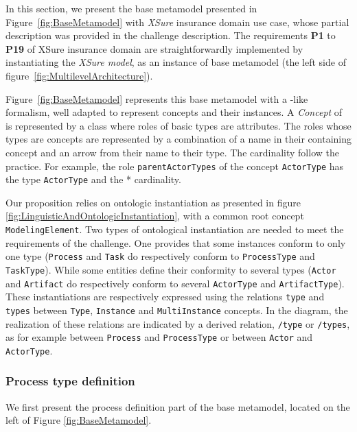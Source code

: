In this section, we present the base metamodel presented in Figure~\ref{fig:BaseMetamodel} with \textit{XSure} insurance domain use case, whose partial description was provided in the challenge description. The requirements \textbf{P1} to \textbf{P19} of XSure insurance domain are straightforwardly implemented by instantiating the \emph{XSure model}, as an instance of base metamodel (the left side of figure~\ref{fig:MultilevelArchitecture}).

Figure~\ref{fig:BaseMetamodel} represents this base metamodel with a \UML-like formalism, well adapted to represent \FML concepts and their instances. A \textit{Concept} of \FML is represented by a \UML class where roles of basic types are attributes. The roles whose types are concepts are represented by a combination of a name in their containing concept and an arrow from their name to their type. The cardinality follow the \UML practice.
For example, the role \texttt{parentActorTypes} of the concept \texttt{ActorType} has the type \texttt{ActorType} and the * cardinality.

Our proposition relies on ontologic instantiation as presented in figure \ref{fig:LinguisticAndOntologicInstantiation}, with a common root concept \texttt{ModelingElement}. Two types of ontological instantiation are needed to meet the requirements of the challenge. One provides that some instances conform to only one type (\texttt{Process} and \texttt{Task} do respectively conform to \texttt{ProcessType} and \texttt{TaskType}). While some entities define their conformity to several types (\texttt{Actor} and \texttt{Artifact} do respectively conform to several \texttt{ActorType} and \texttt{ArtifactType}). These instantiations are respectively expressed using the relations \texttt{type} and \texttt{types} between \texttt{Type}, \texttt{Instance} and \texttt{MultiInstance} concepts. In the diagram, the realization of these relations are indicated by a derived relation, \texttt{/type} or \texttt{/types}, as for example between \texttt{Process} and \texttt{ProcessType} or between \texttt{Actor} and \texttt{ActorType}.

\subsubsection{Process type definition}

We first present the process definition part of the base metamodel, located on the left of Figure \ref{fig:BaseMetamodel}.


